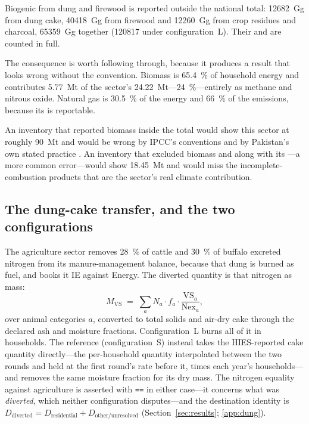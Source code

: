 Biogenic \COtwo{} from dung and firewood is reported outside the national total:
\SI{12682}{\giga\gram} from dung cake, \SI{40418}{\giga\gram} from firewood and
\SI{12260}{\giga\gram} from crop residues and charcoal,
\SI{65359}{\giga\gram} together (\SI{120817}{} under configuration~L). Their \CHfour{} and \NtwoO{}
are counted in full.

The consequence is worth following through, because it produces a result that looks
wrong without the convention. Biomass is \SI{65.4}{\percent} of household energy and
contributes \SI{5.77}{\mega\tonne} of the sector's
\SI{24.22}{\mega\tonne}---\SI{24}{\percent}---entirely as methane and nitrous oxide.
Natural gas is \SI{30.5}{\percent} of the energy and \SI{66}{\percent} of the
emissions, because its \COtwo{} is reportable.

An inventory that reported biomass \COtwo{} inside the total would show this sector at
roughly \SI{90}{\mega\tonne} and would be wrong by IPCC's conventions and by
Pakistan's own stated practice \citep{pakbur1}. An inventory that excluded biomass
\CHfour{} and \NtwoO{} along with its \COtwo{}---a more common error---would show
\SI{18.45}{\mega\tonne} and would miss the incomplete-combustion products that are the
sector's real climate contribution.

\subsection{The dung-cake transfer, and the two configurations}
\label{sec:dungmethod}

The agriculture sector removes \SI{28}{\percent} of cattle and \SI{30}{\percent} of
buffalo excreted nitrogen from its manure-management balance, because that dung is
burned as fuel, and books it IE against Energy. The diverted quantity is that nitrogen
as mass:
\begin{equation}
M_{\mathrm{VS}} \;=\; \sum_{a} N_a \cdot f_a \cdot \frac{\mathrm{VS}_a}{\mathrm{Nex}_a},
\end{equation}
over animal categories $a$, converted to total solids and air-dry cake through the
declared ash and moisture fractions. Configuration~L burns all of it in households. The
reference (configuration~S) instead takes the HIES-reported cake quantity directly---the
per-household quantity interpolated between the two rounds and held at the first round's
rate before it, times each year's households---and removes the same moisture fraction
for its dry mass. The nitrogen equality against
agriculture is asserted with \texttt{==} in either case---it concerns what was
\emph{diverted}, which neither configuration disputes---and the destination identity is
$D_{\text{diverted}} = D_{\text{residential}} + D_{\text{other/unresolved}}$
(Section~\ref{sec:results}; \ref{app:dung}).


